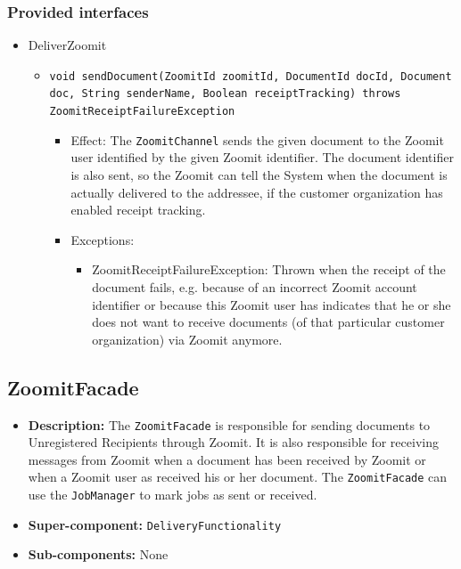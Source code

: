 \documentclass[a4paper,10pt]{article}
\begin{document}
\subsubsection*{Provided interfaces}
\begin{itemize}
    \item DeliverZoomit
    \begin{itemize}
        \item \texttt{void sendDocument(ZoomitId zoomitId, DocumentId docId, Document doc, String senderName, Boolean receiptTracking) throws ZoomitReceiptFailureException}
        \begin{itemize}
            \item Effect: The \texttt{ZoomitChannel} sends the given document to the Zoomit user identified by the given Zoomit identifier. The document identifier is also sent, so the Zoomit can tell the System when the document is actually delivered to the addressee, if the customer organization has enabled receipt tracking.
            \item Exceptions:
            \begin{itemize}
                \item ZoomitReceiptFailureException: Thrown when the receipt of the document fails, e.g. because of an incorrect Zoomit account identifier or because this Zoomit user has indicates that he or she does not want to receive documents (of that particular customer organization) via Zoomit anymore.
            \end{itemize}
		\end{itemize}
    \end{itemize}
\end{itemize}

\subsection{ZoomitFacade}
\begin{itemize}
    \item \textbf{Description:} The \texttt{ZoomitFacade} is responsible for sending documents to Unregistered Recipients through Zoomit. It is also responsible for receiving messages from Zoomit when a document has been received by Zoomit or when a Zoomit user as received his or her document. The \texttt{ZoomitFacade} can use the \texttt{JobManager} to mark jobs as sent or received.
    \item \textbf{Super-component:} \texttt{DeliveryFunctionality}
    \item \textbf{Sub-components:} None
\end{itemize}
\end{document}

